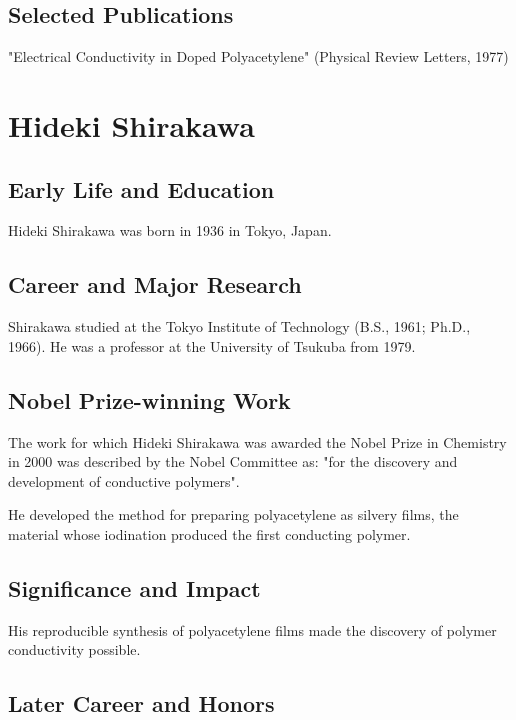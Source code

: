 \subsection*{Selected Publications}

"Electrical Conductivity in Doped Polyacetylene" (Physical Review Letters, 1977)

\clearpage

\section{Hideki Shirakawa}

\subsection*{Early Life and Education}

Hideki Shirakawa was born in 1936 in Tokyo, Japan.

\subsection*{Career and Major Research}

Shirakawa studied at the Tokyo Institute of Technology (B.S., 1961; Ph.D., 1966). He was a professor at the University of Tsukuba from 1979.

\subsection*{Nobel Prize-winning Work}

The work for which Hideki Shirakawa was awarded the Nobel Prize in Chemistry in 2000 was described by the Nobel Committee as: "for the discovery and development of conductive polymers".

He developed the method for preparing polyacetylene as silvery films, the material whose iodination produced the first conducting polymer.

\subsection*{Significance and Impact}

His reproducible synthesis of polyacetylene films made the discovery of polymer conductivity possible.

\subsection*{Later Career and Honors}

